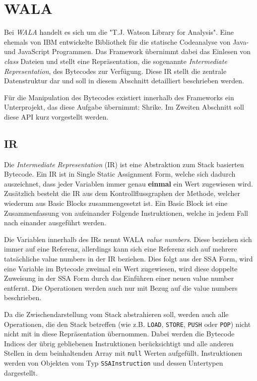 \section{WALA}

Bei \textit{WALA} handelt es sich um die "T.J. Watson Library for Analysis". Eine ehemals von IBM 
entwickelte Bibliothek für die statische Codeanalyse von Java- und JavaScript Programmen. Das Framework 
übernimmt dabei das Einlesen von \textit{class} Dateien und stellt eine Repräsentation, die sogenannte 
\textit{Intermediate Representation}, des Bytecodes zur Verfügung. Diese IR stellt die zentrale 
Datenstruktur dar und soll in diesem Abschnitt detailliert beschrieben werden.

Für die Manipulation des Bytecodes existiert innerhalb des Frameworks ein Unterprojekt, das diese Aufgabe 
übernimmt: Shrike. Im Zweiten Abschnitt soll diese API kurz vorgestellt werden.  

\subsection{IR}

Die \textit{Intermediate Representation} (IR) ist eine Abstraktion zum Stack basierten Bytecode. Ein IR ist
in Single Static Assignment Form, welche sich dadurch auszeichnet, dass jeder Variablen immer genau 
\textbf{einmal} ein Wert zugewiesen wird. Zusätzlich besteht die IR aus dem Kontrollflussgraphen der 
Methode, welcher wiederum aus Basic Blocks zusammengesetzt ist. Ein Basic Block ist eine Zusammenfassung 
von aufeinander Folgende Instruktionen, welche in jedem Fall nach einander ausgeführt werden.

Die Variablen innerhalb des IRs nennt WALA \textit{value numbers}. Diese beziehen sich immer auf eine 
Referenz, allerdings kann sich eine Referenz sich auf mehrere tatsächliche value numbers in der IR beziehen.
Dies folgt aus der SSA Form, wird eine Variable im Bytecode zweimal ein Wert zugewiesen, wird diese 
doppelte Zuweisung in der SSA Form durch das Einführen einer neuen value number entfernt. Die Operationen
werden auch nur mit Bezug auf die value numbers beschrieben.   
 
Da die Zwischendarstellung vom Stack abstrahieren soll, werden auch alle Operationen, die den Stack betreffen
(wie z.B. \texttt{LOAD}, \texttt{STORE}, \texttt{PUSH} oder \texttt{POP}) nicht nicht mit in diese 
Repräsentation übernommen. Dabei werden die Bytecode Indices der übrig gebliebenen Instruktionen 
berücksichtigt und alle anderen Stellen in dem beinhaltenden Array mit \texttt{null} Werten aufgefüllt.
Instruktionen werden von Objekten vom Typ \texttt{SSAInstruction} und dessen Untertypen dargestellt.

